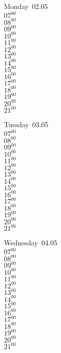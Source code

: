 \documentclass[11pt,a4paper]{book}\usepackage[]{graphicx}\usepackage[]{color}
\begin{document}
\begin{headerbox}
\end{headerbox}
\begin{weekdaybox}
  Monday~02.05\\
  { 
  \vfill
  $07^{00}$\\
$08^{00}$\\
$09^{00}$\\
$10^{00}$\\
$11^{00}$\\
$12^{00}$\\
$13^{00}$\\
$14^{00}$\\
$15^{00}$\\
$16^{00}$\\
$17^{00}$\\
$18^{00}$\\
$19^{00}$\\
$20^{00}$\\
$21^{00}$\\
  }
\end{weekdaybox}
\begin{weekdaybox}
  Tuesday~03.05\\
  { 
  \vfill
  $07^{00}$\\
$08^{00}$\\
$09^{00}$\\
$10^{00}$\\
$11^{00}$\\
$12^{00}$\\
$13^{00}$\\
$14^{00}$\\
$15^{00}$\\
$16^{00}$\\
$17^{00}$\\
$18^{00}$\\
$19^{00}$\\
$20^{00}$\\
$21^{00}$\\
  }
\end{weekdaybox}
\begin{weekdaybox}
  Wednesday~04.05\\
  { 
  \vfill
  $07^{00}$\\
$08^{00}$\\
$09^{00}$\\
$10^{00}$\\
$11^{00}$\\
$12^{00}$\\
$13^{00}$\\
$14^{00}$\\
$15^{00}$\\
$16^{00}$\\
$17^{00}$\\
$18^{00}$\\
$19^{00}$\\
$20^{00}$\\
$21^{00}$\\
  }
\end{weekdaybox}
\end{document}
